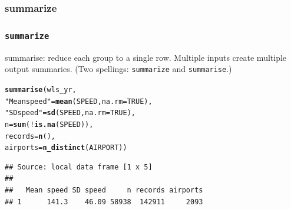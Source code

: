 \documentclass{beamer}\usepackage[]{graphicx}\usepackage[]{color}
\makeatletter
\newcommand{\hlnum}[1]{\textcolor[rgb]{0.686,0.059,0.569}{#1}}%
\newcommand{\hlstr}[1]{\textcolor[rgb]{0.192,0.494,0.8}{#1}}%
\newcommand{\hlopt}[1]{\textcolor[rgb]{0,0,0}{#1}}%
\newcommand{\hlstd}[1]{\textcolor[rgb]{0.345,0.345,0.345}{#1}}%
\newcommand{\hlkwc}[1]{\textcolor[rgb]{0.333,0.667,0.333}{#1}}%
\newcommand{\hlkwd}[1]{\textcolor[rgb]{0.737,0.353,0.396}{\textbf{#1}}}%
\newenvironment{kframe}{%
 \def\at@end@of@kframe{}%
 \ifinner\ifhmode%
  \def\at@end@of@kframe{\end{minipage}}%
  \begin{minipage}{\columnwidth}%
 \fi\fi%
 \def\FrameCommand##1{\hskip\@totalleftmargin \hskip-\fboxsep
 \colorbox{shadecolor}{##1}\hskip-\fboxsep
     \hskip-\linewidth \hskip-\@totalleftmargin \hskip\columnwidth}%
 \MakeFramed {\advance\hsize-\width
   \@totalleftmargin\z@ \linewidth\hsize
   \@setminipage}}%
 {\par\unskip\endMakeFramed%
 \at@end@of@kframe}
\newenvironment{knitrout}{}{} %
\makeatother
\begin{document}
\subsubsection{summarize}%
\begin{frame}[fragile]
  \frametitle{{\tt summarize}}
summarise: reduce each group to a single row. Multiple
inputs create multiple output summaries.  (Two spellings:
{\tt summarize} and {\tt summarise}.)
\begin{knitrout}\footnotesize
{}\color{fgcolor}\begin{kframe}
\begin{alltt}
\hlkwd{summarise}\hlstd{(wls_yr,}
          \hlstr{"Mean speed"} \hlstd{=} \hlkwd{mean}\hlstd{(SPEED,} \hlkwc{na.rm} \hlstd{=} \hlnum{TRUE}\hlstd{),}
          \hlstr{"SD speed"}   \hlstd{=} \hlkwd{sd}\hlstd{(SPEED,} \hlkwc{na.rm} \hlstd{=} \hlnum{TRUE}\hlstd{),}
          \hlkwc{n}            \hlstd{=} \hlkwd{sum}\hlstd{(}\hlopt{!}\hlkwd{is.na}\hlstd{(SPEED)),}
          \hlkwc{records}      \hlstd{=} \hlkwd{n}\hlstd{(),}
          \hlkwc{airports}     \hlstd{=} \hlkwd{n_distinct}\hlstd{(AIRPORT))}
\end{alltt}
\begin{verbatim}
## Source: local data frame [1 x 5]
## 
##   Mean speed SD speed     n records airports
## 1      141.3    46.09 58938  142911     2093
\end{verbatim}
\end{kframe}
\end{knitrout}
\end{frame} 
\end{document}
